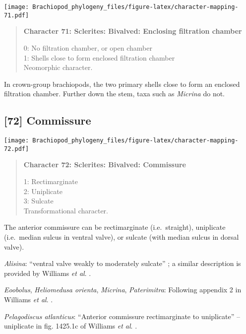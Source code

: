 \documentclass[openany]{book}
\theoremstyle{definition}
\theoremstyle{definition}
\theoremstyle{definition}
\theoremstyle{remark}
\begin{document}
\texttt{[image: Brachiopod\_phylogeny\_files/figure-latex/character-mapping-71.pdf]}

\begin{quote}
\textbf{Character 71: Sclerites: Bivalved: Enclosing filtration chamber}

0: No filtration chamber, or open chamber\\
1: Shells close to form enclosed filtration chamber\\
Neomorphic character.
\end{quote}

In crown-group brachiopods, the two primary shells close to form an
enclosed filtration chamber. Further down the stem, taxa such as
\emph{Micrina} do not.

\subsection*{{[}72{]} Commissure}\label{commissure}

\texttt{[image: Brachiopod\_phylogeny\_files/figure-latex/character-mapping-72.pdf]}

\begin{quote}
\textbf{Character 72: Sclerites: Bivalved: Commissure}

1: Rectimarginate\\
2: Uniplicate\\
3: Sulcate\\
Transformational character.
\end{quote}

The anterior commissure can be rectimarginate (i.e.~straight),
uniplicate (i.e.~median sulcus in ventral valve), or sulcate (with
median sulcus in dorsal valve).

\hypertarget{Alisina-coding-72}{}
\emph{Alisina}: ``ventral valve weakly to moderately sulcate''
\citep{Topper2013Theoldest}; a similar description is provided by
Williams \emph{et al}.
\citeyearpar{Williams2000LinguliformeaCraniiformea}.

\hypertarget{Eoobolus-coding-72}{}
\emph{Eoobolus}, \emph{Heliomedusa orienta}, \emph{Micrina},
\emph{Paterimitra}: Following appendix 2 in Williams \emph{et al}.
\citeyearpar{Williams1998Thediversity}.

\hypertarget{Pelagodiscus_atlanticus-coding-72}{}
\emph{Pelagodiscus atlanticus}: ``Anterior commissure rectimarginate to
uniplicate'' -- uniplicate in fig. 1425.1c of Williams \emph{et al}.
\citeyearpar{Williams2006Rhynchonelliformeapart}.
\end{document}
